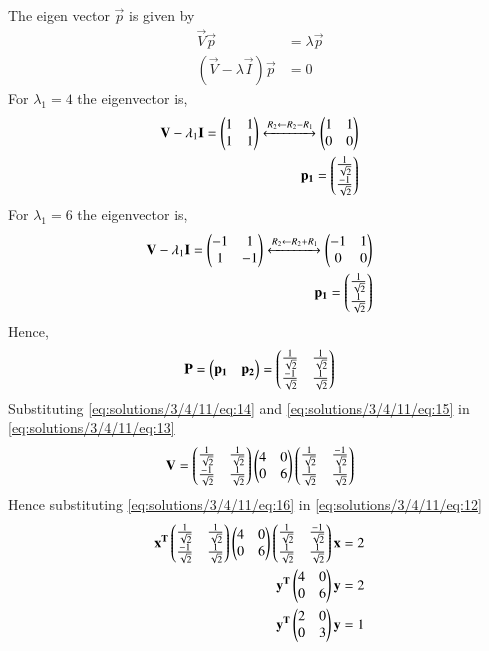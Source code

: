 The eigen vector $\vec{p}$ is given by
\begin{align}
    \vec{V}\vec{p}&=\lambda\vec{p}\\
    (\vec{V}-\lambda\vec{I})\vec{p}&=0
\end{align}
For $\lambda_1 = 4$  the eigenvector is,
\begin{align}
\mathbf{V}-\lambda_1\mathbf{I}= \begin{pmatrix}1&1\\1&1\end{pmatrix} \xleftrightarrow[]{R_2 \leftarrow R_2-R_1}\begin{pmatrix}1&1\\0&0\end{pmatrix}\\
\mathbf{p_1}=\begin{pmatrix}\frac{1}{\sqrt{2}}\\\frac{-1}{\sqrt{2}}\end{pmatrix}
\end{align}
For $\lambda_1 = 6$  the eigenvector is,
\begin{align}
\mathbf{V}-\lambda_1\mathbf{I}= \begin{pmatrix}-1&1\\1&-1\end{pmatrix} \xleftrightarrow[]{R_2 \leftarrow R_2+R_1}\begin{pmatrix}-1&1\\0&0\end{pmatrix}\\
\mathbf{p_1}=\begin{pmatrix}\frac{1}{\sqrt{2}}\\\frac{1}{\sqrt{2}}\end{pmatrix}
\end{align}
Hence,
\begin{align}
\mathbf{P} =\begin{pmatrix}\mathbf{p_1}&\mathbf{p_2}\end{pmatrix} = \begin{pmatrix}\frac{1}{\sqrt{2}}&\frac{1}{\sqrt{2}}\\\frac{-1}{\sqrt{2}}&\frac{1}{\sqrt{2}}\end{pmatrix} \label{eq:solutions/3/4/11/eq:15}
\end{align}
Substituting \eqref{eq:solutions/3/4/11/eq:14} and \eqref{eq:solutions/3/4/11/eq:15} in \eqref{eq:solutions/3/4/11/eq:13}
\begin{align}
\mathbf{V}= \begin{pmatrix}\frac{1}{\sqrt{2}}&\frac{1}{\sqrt{2}}\\\frac{-1}{\sqrt{2}}&\frac{1}{\sqrt{2}}\end{pmatrix}\begin{pmatrix}4&0\\0&6\end{pmatrix}\begin{pmatrix}\frac{1}{\sqrt{2}}&\frac{-1}{\sqrt{2}}\\\frac{1}{\sqrt{2}}&\frac{1}{\sqrt{2}}\end{pmatrix}\label{eq:solutions/3/4/11/eq:16}
\end{align}
Hence substituting \eqref{eq:solutions/3/4/11/eq:16} in \eqref{eq:solutions/3/4/11/eq:12}
\begin{align}
\mathbf{x^T}\begin{pmatrix}\frac{1}{\sqrt{2}}&\frac{1}{\sqrt{2}}\\\frac{-1}{\sqrt{2}}&\frac{1}{\sqrt{2}}\end{pmatrix}\begin{pmatrix}4&0\\0&6\end{pmatrix}\begin{pmatrix}\frac{1}{\sqrt{2}}&\frac{-1}{\sqrt{2}}\\\frac{1}{\sqrt{2}}&\frac{1}{\sqrt{2}}\end{pmatrix}\mathbf{x}=2\\
\mathbf{y^T}\begin{pmatrix}4&0\\0&6\end{pmatrix}\mathbf{y}=2\\
\mathbf{y^T}\begin{pmatrix}2&0\\0&3\end{pmatrix}\mathbf{y}=1\label{eq:solutions/3/4/11/eq:17}
\end{align}
